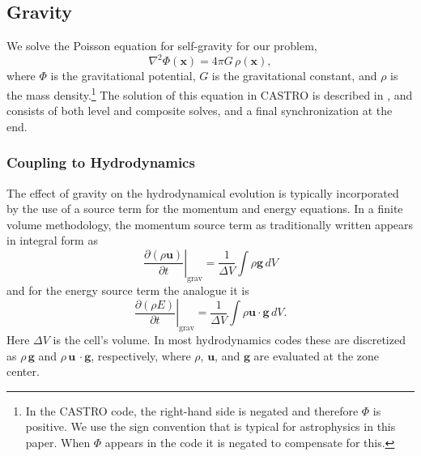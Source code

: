 \documentclass[iop]{../emulateapj}
\begin{document}
\subsection{Gravity}
\label{sec:gravity}

We solve the Poisson equation for self-gravity for our problem,
\begin{equation}
  \nabla^2 \Phi(\mathbf{x}) = 4\pi G\, \rho(\mathbf{x}),
\end{equation}
where $\Phi$ is the gravitational potential, $G$ is the gravitational
constant, and $\rho$ is the mass density.\footnote{In the CASTRO code, the 
right-hand side is negated and therefore $\Phi$ is positive. We use the 
sign convention that is typical for astrophysics in this paper. 
When $\Phi$ appears in the code it is negated to compensate for this.} 
The solution of this equation in CASTRO is described in \cite{castro}, and
consists of both level and composite solves, and a final
synchronization at the end.

\subsubsection{Coupling to Hydrodynamics}\label{sec:gravity_hydro_coupling}

The effect of gravity on the hydrodynamical evolution is typically
incorporated by the use of a source term for the momentum and energy
equations. In a finite volume methodology, the momentum source term 
as traditionally written appears in integral form as
\begin{equation}
  \left.\frac{\partial (\rho \mathbf{u})}{\partial t}\right|_{\text{grav}} = \frac{1}{\Delta V} \int \rho \mathbf{g}\, dV
\end{equation}
and for the energy source term the analogue it is
\begin{equation}
  \left.\frac{\partial (\rho E)}{\partial t}\right|_{\text{grav}} = \frac{1}{\Delta V} \int \rho \mathbf{u}\cdot\mathbf{g}\, dV \label{eq:cell_center_gravity_source}.
\end{equation}
Here $\Delta V$ is the cell's volume.
In most hydrodynamics codes these are discretized as $\rho\,
\mathbf{g}$ and $\rho\, \mathbf{u}\,\cdot\mathbf{g}$, respectively, 
where $\rho$, $\mathbf{u}$, and $\mathbf{g}$ 
are evaluated at the zone center. 
\end{document}

